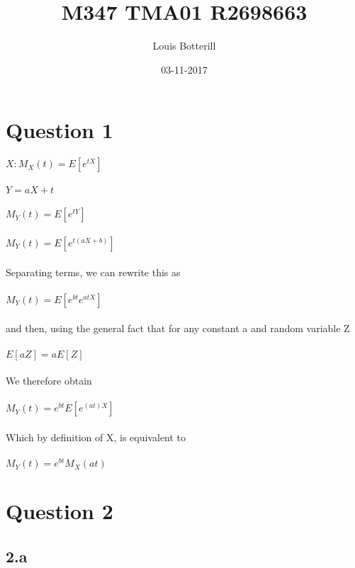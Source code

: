 \documentclass[11pt]{article}   	%
\title{M347 TMA01 R2698663}
\author{Louis Botterill}
\date{03-11-2017}					%
\begin{document}
\maketitle

\pagebreak

\section*{Question 1}

$ X : M_X(t) = E\left[ e^{tX} \right] $ \\
\\
$ Y = aX + t $ \\
\\
$ M_Y(t) = E\left[ e^{tY} \right] $ \\
\\
$ M_Y(t) = E\left[ e^{t(aX + b)} \right] $ \\
\\
Separating terms, we can rewrite this as \\
\\
$ M_Y(t) = E\left[ e^{bt}e^{atX} \right] $ \\
\\
and then, using the general fact that for any constant a and random variable Z \\
\\
$ E\left[aZ\right] = aE\left[Z\right] $ \\
\\
We therefore obtain \\
\\
$ M_Y(t) = e^{bt} E\left[ e^{(at)X} \right] $ \\
\\
Which by definition of X, is equivalent to \\
\\
$ M_Y(t) = e^{bt} M_X(at) $ \\


\section*{Question 2}

\subsection*{2.a}
\end{document}

